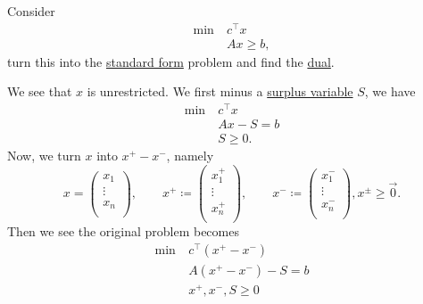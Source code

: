 \begin{eg}
	Consider
	\begin{align*}
		\min~ & c^{\top}x  \\
		      & Ax \geq b,
	\end{align*}
	turn this into the \hyperref[def:standard-form]{standard form} problem and find the \hyperref[def:dual]{dual}.
\end{eg}
\begin{explanation}
	We see that \(x\) is unrestricted. We first minus a \hyperref[def:surplus-variable]{surplus variable} \(S\), we have
	\begin{align*}
		\min~ & c^{\top}x \\
		      & Ax - S= b \\
		      & S \geq 0.
	\end{align*}
	Now, we turn \(x\) into \(x^+ - x^-\), namely
	\[
		x = \begin{pmatrix}
			x_1    \\
			\vdots \\
			x_n    \\
		\end{pmatrix},\qquad
		x^+ \coloneqq \begin{pmatrix}
			x^+_1  \\
			\vdots \\
			x^+_n  \\
		\end{pmatrix},\qquad
		x^- \coloneqq \begin{pmatrix}
			x^-_1  \\
			\vdots \\
			x^-_n  \\
		\end{pmatrix}, x^\pm \geq \vec{0}.
	\]
	Then we see the original problem becomes
	\begin{align*}
		\min~ & c^{\top}(x^+ - x^-)  \\
		      & A(x^+ - x^-) - S = b \\
		      & x^+, x^-, S \geq 0
	\end{align*}


\end{explanation}
